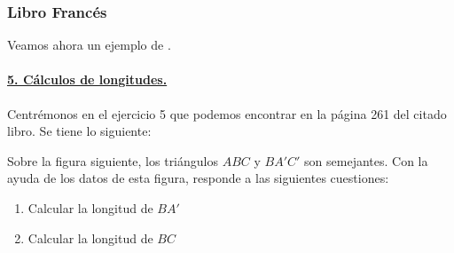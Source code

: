 \subsubsection*{Libro Francés}

	Veamos ahora un ejemplo de \citet{fr}. 
	
	\paragraph{\underline{5. Cálculos de longitudes.}}Centrémonos en el ejercicio 5 que podemos encontrar en la página 261 del citado libro. Se tiene lo siguiente:
	\vspace{0.5cm}
	\begin{multicols}{2}
		\begin{minipage}{9cm}
	
	Sobre la figura siguiente, los triángulos $ABC$ y $BA'C'$ son semejantes. Con la ayuda de los datos de esta figura, responde a las siguientes cuestiones:
	\begin{enumerate}
		\item Calcular la longitud de $BA'$
		\item Calcular la longitud de $BC$
	\end{enumerate}
	\end{minipage}
		
	\columnbreak
	

\end{multicols}
